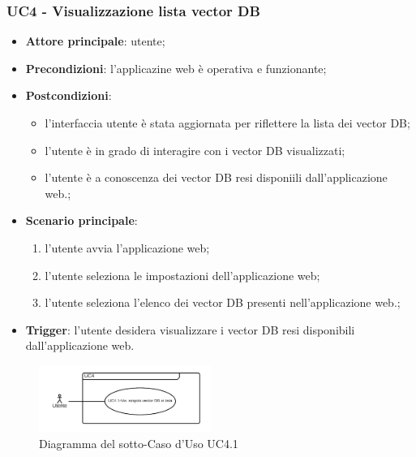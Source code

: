 \documentclass[10pt, a4paper]{article}
\begin{document}
    \subsubsection{UC4 - Visualizzazione lista vector DB}
    \begin{itemize}
        \item \textbf{Attore principale}: utente;
        \item \textbf{Precondizioni}: l'applicazine web è operativa e funzionante;
        \item \textbf{Postcondizioni}: 
        \begin{itemize}
            \item l'interfaccia utente è stata aggiornata per riflettere la lista dei vector DB;
            \item l'utente è in grado di interagire con i vector DB visualizzati;
            \item l'utente è a conoscenza dei vector DB resi disponiili dall'applicazione web.;
        \end{itemize}
        \item \textbf{Scenario principale}:
            \begin{enumerate}
                \item l'utente avvia l'applicazione web;
                \item l'utente seleziona le impostazioni dell'applicazione web;
                \item l'utente seleziona l'elenco dei vector DB presenti nell'applicazione web.;
            \end{enumerate}
        \item \textbf{Trigger}: l'utente desidera visualizzare i vector DB resi disponibili dall'applicazione web.
    \end{itemize}

    \begin{figure}[h]
        \centering
        \includegraphics[width=0.5\textwidth, height=0.5\textheight, keepaspectratio]{UC-images/UC4.1.png}
        \caption{Diagramma del sotto-Caso d'Uso UC4.1}
    \end{figure}
\end{document}
